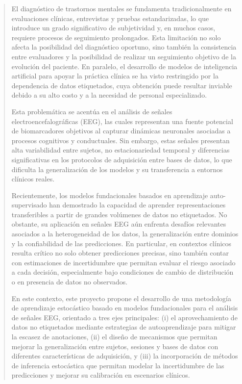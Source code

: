 \begin{abstract}
El diagnóstico de trastornos mentales se fundamenta tradicionalmente en evaluaciones clínicas, entrevistas y pruebas estandarizadas, lo que introduce un grado significativo de subjetividad y, en muchos casos, requiere procesos de seguimiento prolongados. Esta limitación no solo afecta la posibilidad del diagnóstico oportuno, sino también la consistencia entre evaluadores y la posibilidad de realizar un seguimiento objetivo de la evolución del paciente. En paralelo, el desarrollo de modelos de inteligencia artificial para apoyar la práctica clínica se ha visto restringido por la dependencia de datos etiquetados, cuya obtención puede resultar inviable debido a su alto costo y a la necesidad de personal especializado.

Esta problemática se acentúa en el análisis de señales electroencefalográficas (EEG), las cuales representan una fuente potencial de biomarcadores objetivos al capturar dinámicas neuronales asociadas a procesos cognitivos y conductuales. Sin embargo, estas señales presentan alta variabilidad entre sujetos, no estacionariedad temporal y diferencias significativas en los protocolos de adquisición entre bases de datos, lo que dificulta la generalización de los modelos y su transferencia a entornos clínicos reales.

Recientemente, los modelos fundacionales basados en aprendizaje auto-supervisado han demostrado la capacidad de aprender representaciones transferibles a partir de grandes volúmenes de datos no etiquetados. No obstante, su aplicación en señales EEG aún enfrenta desafíos relevantes asociados a la heterogeneidad de los datos, la generalización entre dominios y la confiabilidad de las predicciones. En particular, en contextos clínicos resulta crítico no solo obtener predicciones precisas, sino también contar con estimaciones de incertidumbre que permitan evaluar el riesgo asociado a cada decisión, especialmente bajo condiciones de cambio de distribución o en presencia de datos no observados.

En este contexto, este proyecto propone el desarrollo de una metodología de aprendizaje estocástico basado en modelos fundacionales para el análisis de señales EEG, orientado a tres ejes principales: (i) el aprovechamiento de datos no etiquetados mediante estrategias de autoaprendizaje para mitigar la escasez de anotaciones, (ii) el diseño de mecanismos que permitan mejorar la generalización entre sujetos, sesiones y bases de datos con diferentes características de adquisición, y (iii) la incorporación de métodos de inferencia estocástica que permitan modelar la incertidumbre de las predicciones y mejorar su calibración en escenarios clínicos.


\end{abstract}
